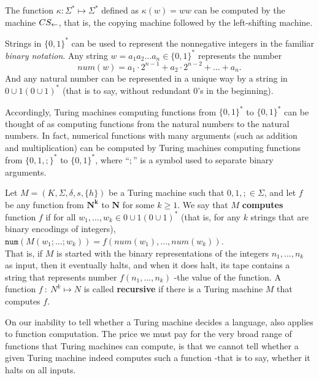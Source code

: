 \begin{example}{}
The function $\kappa: \Sigma^* \mapsto \Sigma^*$ defined as $\kappa(w) = ww$ can be computed by the machine $CS_{\leftarrow}$, that is, the copying machine followed by the left-shifting machine.
\end{example}

Strings in $\{ 0, 1 \}^*$ can be used to represent the nonnegative integers in the familiar \textit{binary notation}. Any string $w = a_1a_2 \ldots a_n \in \{ 0, 1 \}^*$ represents the number 
\begin{equation*}
  num(w) = a_1 \cdot 2^{n-1} + a_2 \cdot 2^{n-2} + \ldots + a_n.
\end{equation*}
And any natural number can be represented in a unique way by a string in $0 \cup 1(0 \cup 1)^*$ (that is to say, without redundant 0's in the beginning).

Accordingly, Turing machines computing functions from $\{ 0, 1 \}^*$ to $\{ 0, 1 \}^*$ can be thought of as computing functions from the natural numbers to the natural numbers. In fact, numerical functions with many arguments (such as addition and multiplication) can be computed by Turing machines computing functions from $\{ 0, 1, ; \}^*$ to $\{ 0, 1 \}^*$, where ``$;$'' is a symbol used to separate binary arguments. 

\begin{definition}{}
Let $M = (K, \Sigma, \delta, s, \{h\})$ be a Turing machine such that $0, 1, ; \in \Sigma$, and let $f$ be any function from $\mathbf{N^k}$ to $\mathbf{N}$ for some $k \geq 1$. We say that $M$ \textbf{computes} function $f$ if for all $w_1, \ldots, w_k \in 0 \cup 1(0 \cup 1)^*$ (that is, for any $k$ strings that are binary encodings of integers), $\texttt{num}(M(w_1; \ldots; w_k)) = f(num(w_1), ... ,num(w_k))$. \\

\quad That is, if $M$ is started with the binary representations of the integers $n_1, ..., n_k$ as input, then it eventually halts, and when it does halt, its tape contains a string that represents number $f(n_1, ..., n_k)$ -the value of the function. A function $f\ :\ N^k \mapsto N$ is called \textbf{recursive} if there is a Turing machine $M$ that computes $f$.
\end{definition}

On our inability to tell whether a Turing machine decides a language, also applies to function computation. The price we must pay for the very broad range of functions that Turing machines can compute, is that we cannot tell whether a given Turing machine indeed computes such a function -that is to say, whether it halts on all inputs.

